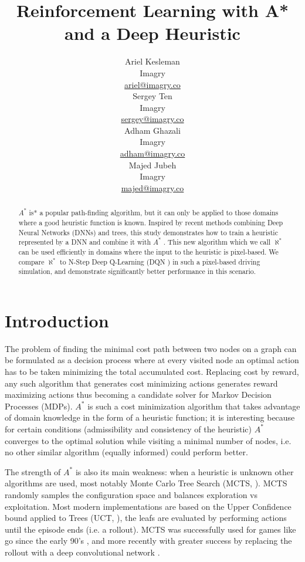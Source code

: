 \documentclass{article}
\title{Reinforcement Learning with A* and a Deep Heuristic}
\author{
  Ariel Kesleman\\
  Imagry\\
  \href{mailto:ariel@imagry.co}{ariel@imagry.co}\\
  \And
  Sergey Ten\\
  Imagry\\
  \href{mailto:}{sergey@imagry.co}\\
  \And
  Adham Ghazali\\
  Imagry\\
  \href{mailto:adham@imagry.co}{adham@imagry.co}\\
  \And
  Majed Jubeh\\
  Imagry\\
  \href{mailto:majed@imagry.co}{majed@imagry.co}\\
}
\newcommand{\alephstar}{$\aleph^*$ }
\newcommand{\astar}{$A^*$ }
\begin{document}
\maketitle


\begin{abstract}
\astar is* a popular path-finding algorithm, but it can only be  applied to those domains where a good heuristic function is known. Inspired by recent methods combining Deep Neural Networks (DNNs) and trees, this study demonstrates how to train a heuristic represented by a DNN and combine it with \astar. This new algorithm which we call \alephstar can be used efficiently in domains where the input to the heuristic is pixel-based. We compare \alephstar to N-Step Deep Q-Learning (DQN \citealt{mnih2013playing}) in such a pixel-based driving simulation, and demonstrate significantly better performance in this scenario.
\end{abstract} 



\section{Introduction}
\label{sec:introduction}

The problem of finding the minimal cost path between two nodes on a graph can be formulated as a decision process where at every visited node an optimal action has to be taken minimizing the total accumulated cost. Replacing cost by reward, any such algorithm that generates cost minimizing actions generates reward maximizing actions thus becoming a candidate solver for Markov Decision Processes (MDPs). \astar \citep{hart68} is such a cost minimization algorithm that takes advantage of domain knowledge in the form of a heuristic function; it is interesting because for certain conditions (admissibility and consistency of the heuristic) \astar converges to the optimal solution while visiting a minimal number of nodes, i.e. no other similar algorithm (equally informed) could perform better. 

The strength of \astar is also its main weakness: when a heuristic is unknown other algorithms are used, most notably Monte Carlo Tree Search (MCTS, \citealt{abramson1987}). MCTS randomly samples the configuration space and balances exploration vs exploitation. Most modern implementations are based on the Upper Confidence bound applied to Trees (UCT, \citealt{kocsis2006}), the leafs are evaluated by performing actions until the episode ends (i.e. a rollout). MCTS was successfully used for games like go since the early 90's \citep{brugmann1993, gelly2006}, and more recently with greater success by replacing the rollout with a deep convolutional network \citep{silver2016, anthony2017, silver2017, silver2017mastering}.
\end{document}

